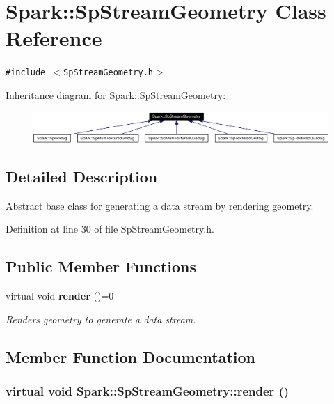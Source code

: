 \section{Spark::Sp\-Stream\-Geometry Class Reference}
\label{classSpark_1_1SpStreamGeometry}
{\tt \#include $<$Sp\-Stream\-Geometry.h$>$}

Inheritance diagram for Spark::Sp\-Stream\-Geometry:\begin{figure}[H]
\begin{center}
\leavevmode
\includegraphics[width=388pt]{classSpark_1_1SpStreamGeometry__inherit__graph}
\end{center}
\end{figure}


\subsection{Detailed Description}
Abstract base class for generating a data stream by rendering geometry. 

Definition at line 30 of file Sp\-Stream\-Geometry.h.\subsection*{Public Member Functions}
\begin{CompactItemize}
\item 
virtual void {\bf render} ()=0
\begin{CompactList}\small\item\em Renders geometry to generate a data stream. \item\end{CompactList}\end{CompactItemize}


\subsection{Member Function Documentation}
\subsubsection{\setlength{\rightskip}{0pt plus 5cm}virtual void Spark::Sp\-Stream\-Geometry::render ()\hspace{0.3cm}{\tt  [pure virtual]}}\label{classSpark_1_1SpStreamGeometry_a0}


